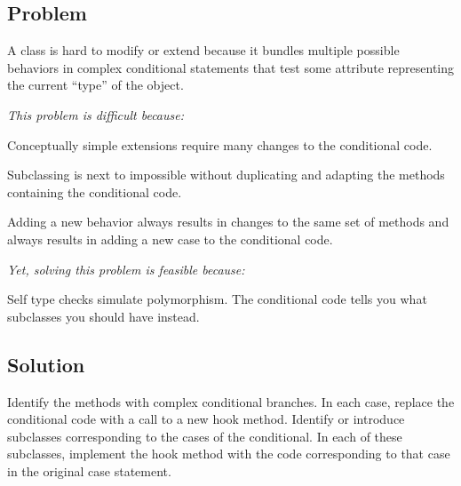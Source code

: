 \documentclass[a4paper,10pt,twoside]{book}
\begin{document}



\subsection*{Problem}

A class is hard to modify or extend because it bundles multiple possible behaviors in complex conditional statements that test some attribute representing the current ``type'' of the object.

\emph{This problem is difficult because:}

\begin{bulletlist}
\item Conceptually simple extensions require many changes to the conditional code.

\item Subclassing is next to impossible without duplicating and adapting the methods containing the conditional code.

\item Adding a new behavior always results in changes to the same set of methods and always results in adding a new case to the conditional code.
\end{bulletlist}

\emph{Yet, solving this problem is feasible because:}

\begin{bulletlist}
\item Self type checks simulate polymorphism. The conditional code tells you what subclasses you should have instead.
\end{bulletlist}

\subsection*{Solution}

Identify the methods with complex conditional branches. In each case, replace the conditional code with a call to a new hook method. Identify or introduce subclasses corresponding to the cases of the conditional. In each of these subclasses, implement the hook method with the code corresponding to that case in the original case statement. 
\end{document}
